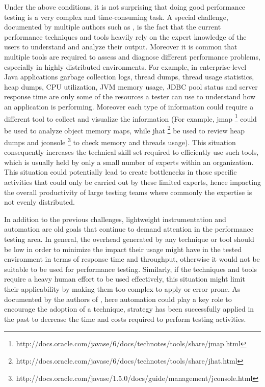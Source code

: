 \documentclass[runningheads,a4paper]{llncs}
\begin{document}
Under the above conditions, it is not surprising that doing good performance
testing is a very complex and time-consuming task. A special challenge, documented by 
multiple authors such as \cite{Woodside2007,trevor1,Angelopoulos2012}, is the
fact that the current performance techniques and tools heavily rely on the expert knowledge of the
users to understand and analyze their output. Moreover it is common that
multiple tools are required to assess and diagnose different performance
problems, especially in highly distributed environments. For example, in
enterprise-level Java applications garbage collection logs, thread dumps, 
thread usage statistics, heap dumps, CPU utilization, JVM memory usage, 
JDBC pool status and server response time are only some of the resources a
tester can use to understand how an application is performing. Moreover each
type of information could require a different tool to collect and visualize the
information (For example, jmap
\footnote{http://docs.oracle.com/javase/6/docs/technotes/tools/share/jmap.html}
could be used to analyze object memory maps, while jhat
\footnote{http://docs.oracle.com/javase/6/docs/technotes/tools/share/jhat.html}
be used to review heap dumps and jconsole
\footnote{http://docs.oracle.com/javase/1.5.0/docs/guide/management/jconsole.html}
to check memory and threads usage). This situation consequently increases the
technical skill set required to efficiently use such tools, which is usually held by only a small number of experts within an organization.
This situation could potentially lead to create bottlenecks in those specific
activities that could only be carried out by these limited experts, hence
impacting the overall productivity of large testing teams where commonly the
expertise is not evenly distributed.

In addition to the previous challenges, lightweight instrumentation and
automation are old goals that continue to demand attention in the performance
testing area. In general, the overhead generated by any technique or tool
should be low in order to minimize the impact their usage might have in the
tested environment in terms of response time and throughput, otherwise it would not be
suitable to be used for performance testing. Similarly, if the techniques and
tools require a heavy human effort to be used effectively, this situation might limit 
their applicability by making them too complex to apply or error prone. As
documented by the authors of \cite{Shahamiri1}, here automation could play a key
role to encourage the adoption of a technique, strategy has been successfully
applied in the past to decrease the time and costs required to perform testing
activities.
\end{document}
